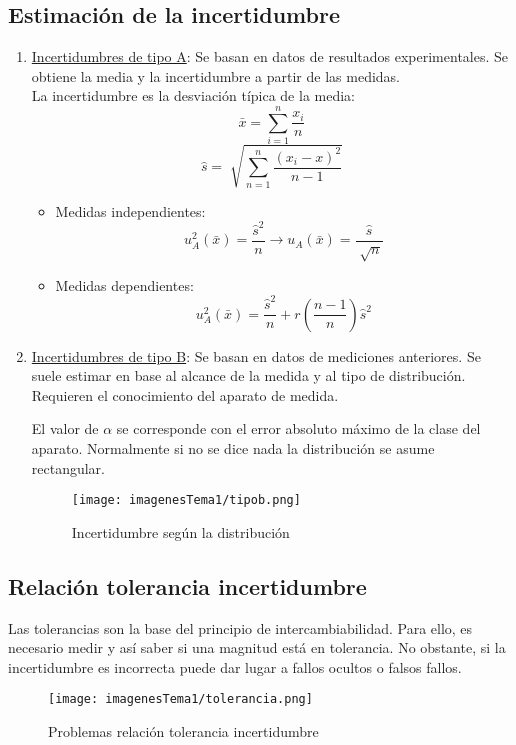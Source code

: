 \subsection{Estimación de la incertidumbre}
\begin{enumerate}
	\item \underline{Incertidumbres de tipo A}: Se basan en datos de resultados experimentales. Se obtiene la media y la incertidumbre a partir de las medidas.
	\\La incertidumbre es la desviación típica de la media:
	\[ \bar x = \sum_{i=1}^{n} \frac{x_i}{n} \]
	\[\hat{s}=\sqrt[]{\sum_{n=1}^n \frac{(x_i -x)^2}{n-1}} \]
	\begin{itemize}
		\item Medidas independientes:
		\[ u_A^2(\bar x) =  \frac{\hat{s}^2}{n} \rightarrow u_A(\bar x) =  \frac{\hat{s}}{\sqrt[]{n}}\]
		\item Medidas dependientes:
		\[ u_A^2(\bar x) =  \frac{\hat{s}^2}{n} + r \left({\frac{n-1}{n}}\right)\hat{s}^2\]
	\end{itemize}
	\item \underline{Incertidumbres de tipo B}: Se basan en datos de mediciones anteriores. Se suele estimar en base al alcance de la medida y al tipo de distribución. Requieren el conocimiento del aparato de medida.
	\begin{flushleft}
	El valor de $\alpha$ se corresponde con el error absoluto máximo de la clase del aparato. Normalmente si no se dice nada la distribución se asume rectangular.
\end{flushleft}
		\begin{figure}[H]
		\centering
		\texttt{[image: imagenesTema1/tipob.png]}  
		\caption{Incertidumbre según la distribución}
		\label{fig:sample}
	\end{figure}
	
\end{enumerate}
\newpage
\subsection{Relación tolerancia incertidumbre}
Las tolerancias son la base del principio de intercambiabilidad. Para ello, es necesario medir y así saber si una magnitud está en tolerancia. No obstante, si la incertidumbre es incorrecta puede dar lugar a fallos ocultos o falsos fallos.
 \begin{figure} [H]
 	\centering
 	\texttt{[image: imagenesTema1/tolerancia.png]}  
 	\caption{Problemas relación tolerancia incertidumbre}
 	\label{fig:sample}
 	\end{figure}
 	
